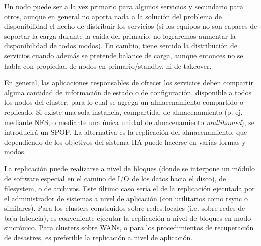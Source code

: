 Un nodo puede ser a la vez primario para algunos servicios y secundario para otros, aunque en general no aporta nada a la solución del problema de disponibilidad el hecho de distribuir los servicios (si los equipos no son capaces de soportar la carga durante la caída del primario, no lograremos aumentar la disponibilidad de todos modos). En cambio, tiene sentido la distribución de servicios cuando además se pretende balance de carga, aunque entonces no se habla con propiedad de nodos en primario/standby, ni de takeover.

En general, las aplicaciones responsables de ofrecer los servicios deben compartir alguna cantidad de información de estado o de configuración, disponible a todos los nodos del cluster, para lo cual se agrega un almacenamiento compartido o replicado. Si existe una sola instancia, compartida, de almacenamiento (p. ej. mediante NFS, o mediante una única unidad de almacenamiento \textit{multihomed}), se introducirá un SPOF. La alternativa es la replicación del almacenamiento, que dependiendo de los objetivos del sistema HA puede hacerse en varias formas y modos. 

La replicación puede realizarse a nivel de bloques (donde se interpone un módulo de software especial en el camino de I/O de los datos hacia el disco), de filesystem, o de archivos. Este último caso sería el de la replicación ejecutada por el administrador de sistemas a nivel de aplicación (con utilitarios como rsync o similares). 
Para los clusters construidos sobre redes locales (i.e. sobre redes de baja latencia), es conveniente ejecutar la replicación a nivel de bloques en modo sincrónico. Para clusters sobre WANs, o para los procedimientos de recuperación de desastres, es preferible la replicación a nivel de aplicación.


